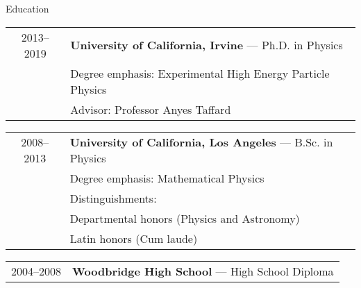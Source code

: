 {\Large Education}\\
\HRule
\vspace{0.25in}

\hspace{0.18in}
\begin{tabular}{c|l}
     2013--2019 & {\bf{University of California, Irvine}} --- Ph.D. in Physics \\
			  & \hspace{0.5cm}Degree emphasis: Experimental High Energy Particle Physics \\
              & \hspace{0.5cm}Advisor: Professor Anyes Taffard
\end{tabular}

\vspace{0.1in}
\hspace{0.18in}
\begin{tabular}{c|l}
    2008--2013 & {\bf{University of California, Los Angeles}} --- B.Sc. in Physics \\
              & \hspace{0.5cm}Degree emphasis: Mathematical Physics \\
			  & \hspace{0.5cm}Distinguishments:\\
              & \hspace{0.8cm}Departmental honors (Physics and Astronomy) \\
              & \hspace{0.8cm}Latin honors (Cum laude) \\
\end{tabular}
\vspace{0.11in}

\hspace{0.18in}
\begin{tabular}{c|l}
    2004--2008 & {\bf{Woodbridge High School}} --- High School Diploma \\
\end{tabular}

